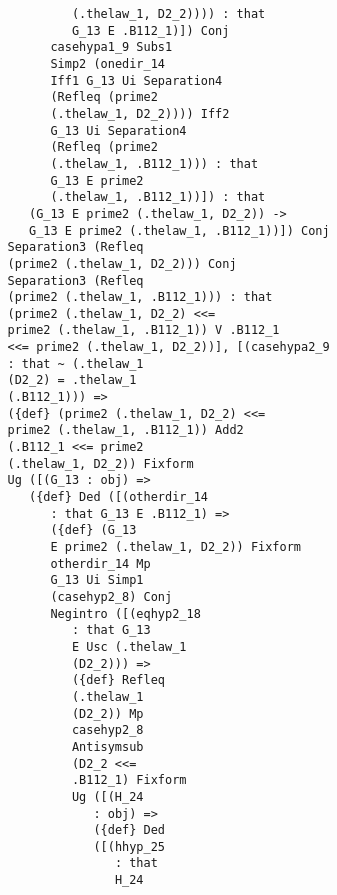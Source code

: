\documentclass[12pt]{article}
\begin{document}
\begin{verbatim}
                               (.thelaw_1, D2_2)))) : that 
                               G_13 E .B112_1)]) Conj 
                            casehypa1_9 Subs1 
                            Simp2 (onedir_14 
                            Iff1 G_13 Ui Separation4 
                            (Refleq (prime2 
                            (.thelaw_1, D2_2)))) Iff2 
                            G_13 Ui Separation4 
                            (Refleq (prime2 
                            (.thelaw_1, .B112_1))) : that 
                            G_13 E prime2 
                            (.thelaw_1, .B112_1))]) : that 
                         (G_13 E prime2 (.thelaw_1, D2_2)) -> 
                         G_13 E prime2 (.thelaw_1, .B112_1))]) Conj 
                      Separation3 (Refleq 
                      (prime2 (.thelaw_1, D2_2))) Conj 
                      Separation3 (Refleq 
                      (prime2 (.thelaw_1, .B112_1))) : that 
                      (prime2 (.thelaw_1, D2_2) <<= 
                      prime2 (.thelaw_1, .B112_1)) V .B112_1 
                      <<= prime2 (.thelaw_1, D2_2))], [(casehypa2_9 
                      : that ~ (.thelaw_1 
                      (D2_2) = .thelaw_1 
                      (.B112_1))) => 
                      ({def} (prime2 (.thelaw_1, D2_2) <<= 
                      prime2 (.thelaw_1, .B112_1)) Add2 
                      (.B112_1 <<= prime2 
                      (.thelaw_1, D2_2)) Fixform 
                      Ug ([(G_13 : obj) => 
                         ({def} Ded ([(otherdir_14 
                            : that G_13 E .B112_1) => 
                            ({def} (G_13 
                            E prime2 (.thelaw_1, D2_2)) Fixform 
                            otherdir_14 Mp 
                            G_13 Ui Simp1 
                            (casehyp2_8) Conj 
                            Negintro ([(eqhyp2_18 
                               : that G_13 
                               E Usc (.thelaw_1 
                               (D2_2))) => 
                               ({def} Refleq 
                               (.thelaw_1 
                               (D2_2)) Mp 
                               casehyp2_8 
                               Antisymsub 
                               (D2_2 <<= 
                               .B112_1) Fixform 
                               Ug ([(H_24 
                                  : obj) => 
                                  ({def} Ded 
                                  ([(hhyp_25 
                                     : that 
                                     H_24 

\end{verbatim}
\end{document}

